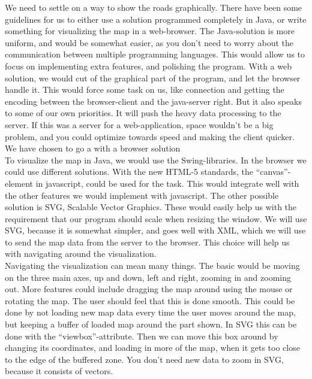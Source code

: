 \documentclass[a4paper,10pt,titlepage]{article}
\begin{document}
We need to settle on a way to show the roads graphically. There have been some guidelines for us to either use a solution programmed completely in Java, or write something for visualizing the map in a web-browser. The Java-solution is more uniform, and would be somewhat easier, as you don't need to worry about the communication between multiple programming languages. This would allow us to focus on implementing extra features, and polishing the program. With a web solution, we would cut of the graphical part of the program, and let the browser handle it. This would force some task on us, like connection and getting the encoding between the browser-client and the java-server right. But it also speaks to some of our own priorities. It will push the heavy data processing to the server. If this was a server for a web-application, space wouldn't be a big problem, and you could optimize towards speed and making the client quicker. We have chosen to go a with a browser solution\\

To visualize the map in Java, we would use the Swing-libraries. In the browser we could use different solutions. With the new HTML-5 standards, the “canvas”-element in javascript, could be used for the task. This would integrate well with the other features we would implement with javascript. The other possible solution is SVG, Scalable Vector Graphics. These would easily help us with the requirement that our program should scale when resizing the window. We will use SVG, because it is somewhat simpler, and goes well with XML, which we will use to send the map data from the server to the browser. This choice will help us with navigating around the visualization.\\

Navigating the visualization can mean many things. The basic would be moving on the three main axes, up and down, left and right, zooming in and zooming out. More features could include dragging the map around using the mouse or rotating the map. The user should feel that this is done smooth. This could be done by not loading new map data every time the user moves around the map, but keeping a buffer of loaded map around the part shown. In SVG this can be done with the “viewbox”-attribute. Then we can move this box around by changing its coordinates, and loading in more of the map, when it gets too close to the edge of the buffered zone. You don’t need new data to zoom in SVG, because it consists of vectors.\\
\end{document}
